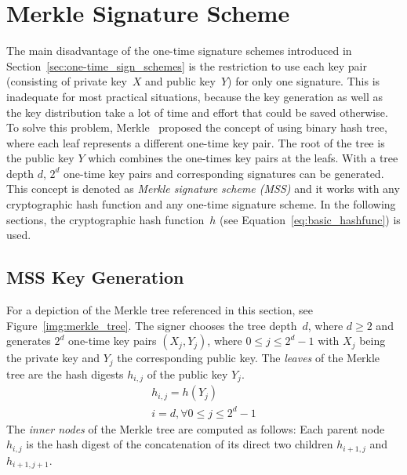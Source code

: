 \section{Merkle Signature Scheme} 
The main disadvantage of the one-time signature schemes introduced in Section~\ref{sec:one-time_sign_schemes} is the restriction to use each key pair (consisting of private key~$X$ and public key~$Y$) for only one signature. This is inadequate for most practical situations, because the key generation as well as the key distribution take a lot of time and effort that could be saved otherwise.
To solve this problem, Merkle~\cite{cha:bg_merkletrees_Merkle_1979} proposed the concept of using binary hash tree, where each leaf represents a different one-time key pair. The root of the tree is the public key $Y$  which combines the one-times key pairs at the leafs. With a tree depth $d$, $2^d$ one-time key pairs and corresponding signatures can be generated. %
This concept is denoted as \textit{Merkle signature scheme (MSS)} and it works with any cryptographic hash function and any one-time signature scheme. In the following sections, the cryptographic hash function~$h$ (see Equation~\ref{eq:basic_hashfunc}) is used. 

\subsection{MSS Key Generation}
For a depiction of the Merkle tree referenced in this section, see Figure~\ref{img:merkle_tree}.
The signer chooses the tree depth~$d$, where $d \geq 2$ and generates $2^d$ one-time key pairs $(X_j, Y_j)$, where $0 \leq j \leq 2^d-1$ with $X_j$ being the private key and $Y_j$ the corresponding public key. The \textit{leaves} of the Merkle tree are the hash digests $h_{i,j}$ of the public key $Y_j$.
\begin{gather}
\label{eq:leaf_merkle_tree:hash_digest_publ_key_Y}
h_{i,j} = h(Y_j) \\
i = d , \forall 0 \leq j \leq 2^d - 1 \nonumber
\end{gather}
The \textit{inner nodes} of the Merkle tree are computed as follows: Each parent node $h_{i,j}$ is the hash digest of the concatenation of its direct two children $h_{i+1,j}$ and $h_{i+1,j+1}$.

